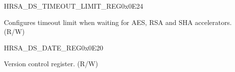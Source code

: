 \begin{register}{H}{RSA\_DS\_TIMEOUT\_LIMIT\_REG}{0x0E24}\label{regdesc:RSADSTIMEOUTLIMITREG}
%
\regnewline%
\begin{regdesc}\begin{reglist}
\label{fielddesc:RSADSTIMEOUTLIMIT}\item [RSA\_DS\_TIMEOUT\_LIMIT] Configures timeout limit when waiting for AES, RSA and SHA accelerators. (R/W)
\end{reglist}\end{regdesc}
\end{register}


\begin{register}{H}{RSA\_DS\_DATE\_REG}{0x0E20}\label{regdesc:RSADSDATEREG}
%
%
\regnewline%
\begin{regdesc}\begin{reglist}
\label{fielddesc:RSADSDATE}\item [RSA\_DS\_DATE] Version control register. (R/W)
\end{reglist}\end{regdesc}
\end{register}


